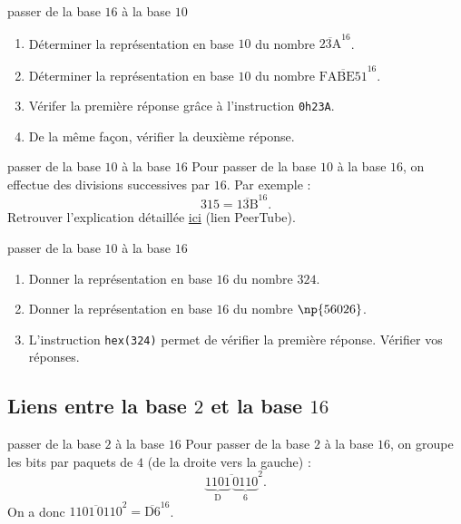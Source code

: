 \documentclass[a4paper,dvipsnames]{article}
\begin{document}
\smallskip

\begin{exercice}{passer de la base $16$ à la base $10$}{}
  \begin{enumerate}
    \item Déterminer la représentation en base $10$ du nombre $\overline{23\text{A}}^{16}$.
    \item Déterminer la représentation en base $10$ du nombre $\overline{\text{FABE}51}^{16}$.
    \item Vérifer la première réponse grâce à l'instruction \texttt{0h23A}.
    \item De la même façon, vérifier la deuxième réponse.
  \end{enumerate}
\end{exercice}

\smallskip

\begin{methode}{passer de la base $10$ à la base $16$}{}
  Pour passer de la base $10$ à la base $16$, on effectue des divisions successives par $16$. Par exemple :
  \[315=\overline{13\text{B}}^{16}.\]
  Retrouver l'explication détaillée \href{https://peertube-lyclpg.ddns.net:9443/videos/watch/5e212b29-e6c0-4a50-a822-97349a733643}{ici} (lien PeerTube).
\end{methode}

\smallskip

\begin{exercice}{passer de la base $10$ à la base $16$}{}
 \begin{enumerate}
   \item Donner la représentation en base $16$ du nombre $324$.
   \item Donner la représentation en base $16$ du nombre $\np{56026}$.
   \item L'instruction \texttt{hex(324)} permet de vérifier la première réponse. Vérifier vos réponses.
 \end{enumerate} 
\end{exercice}

\subsection{Liens entre la base $2$ et la base $16$}

\begin{methode}{passer de la base $2$ à la base $16$}{}
  Pour passer de la base $2$ à la base $16$, on groupe les bits par paquets de $4$ (de la droite vers la gauche) :
  \[\overline{\underbrace{1101}_{\text{D}}\,\underbrace{0110}_{6}}^{2}.\]
  On a donc $\overline{1101\,0110}^2=\overline{\text{D}6}^{16}$.
\end{methode}
\end{document}

